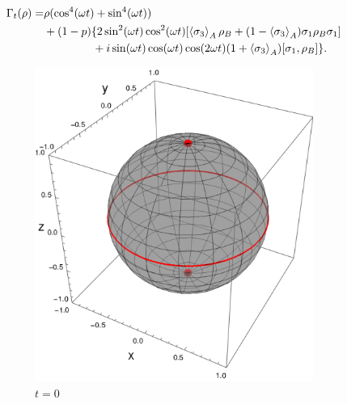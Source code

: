 \begin{align*}
  \Gamma_{t}(\rho)=&\rho(\cos^{4}(\omega t)+\sin^{4}(\omega t))\\
  &+(1-p)\{2\sin^{2}(\omega t)\cos^{2}(\omega t)\qty[\expval{\sigma_{3}}_{A}\rho_{B}+(1-\expval{\sigma_{3}}_{A})\sigma_{1}\rho_{B}\sigma_{1}]\\
  &\ \ \ \ \ \ \ \ \ \ \ \ \ +i\sin(\omega t)\cos(\omega t)\cos(2\omega t)(1+\expval{\sigma_{3}}_{A})[\sigma_{1},\rho_{B}]\}.
\end{align*}
  \begin{figure}[ht!]
  \centering
  \begin{subfigure}{0.32\textwidth}
    \centering
    \includegraphics[width=0.9\linewidth]{chapter3/figures_toy/sphere_CNOT_t=0._r=0.9_p=0.1.png}
    \caption{$t=0$}
  \end{subfigure}%
  \begin{subfigure}{0.32\textwidth}
    \centering

\end{subfigure}
\end{figure}

